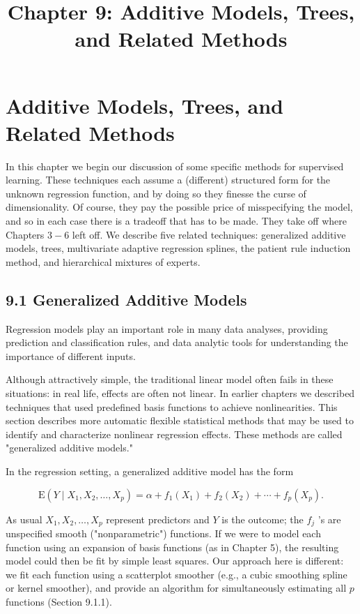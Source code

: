 \documentclass[10pt]{article}
\title{Chapter 9: Additive Models, Trees, and Related Methods}
\author{}
\date{}
\begin{document}
\maketitle

\section*{Additive Models, Trees, and Related Methods}
In this chapter we begin our discussion of some specific methods for supervised learning. These techniques each assume a (different) structured form for the unknown regression function, and by doing so they finesse the curse of dimensionality. Of course, they pay the possible price of misspecifying the model, and so in each case there is a tradeoff that has to be made. They take off where Chapters $3-6$ left off. We describe five related techniques: generalized additive models, trees, multivariate adaptive regression splines, the patient rule induction method, and hierarchical mixtures of experts.

\subsection*{9.1 Generalized Additive Models}
Regression models play an important role in many data analyses, providing prediction and classification rules, and data analytic tools for understanding the importance of different inputs.

Although attractively simple, the traditional linear model often fails in these situations: in real life, effects are often not linear. In earlier chapters we described techniques that used predefined basis functions to achieve nonlinearities. This section describes more automatic flexible statistical methods that may be used to identify and characterize nonlinear regression effects. These methods are called "generalized additive models."

In the regression setting, a generalized additive model has the form


\begin{equation*}
\mathrm{E}\left(Y \mid X_{1}, X_{2}, \ldots, X_{p}\right)=\alpha+f_{1}\left(X_{1}\right)+f_{2}\left(X_{2}\right)+\cdots+f_{p}\left(X_{p}\right) . \tag{9.1}
\end{equation*}


As usual $X_{1}, X_{2}, \ldots, X_{p}$ represent predictors and $Y$ is the outcome; the $f_{j}$ 's are unspecified smooth ("nonparametric") functions. If we were to model each function using an expansion of basis functions (as in Chapter 5), the resulting model could then be fit by simple least squares. Our approach here is different: we fit each function using a scatterplot smoother (e.g., a cubic smoothing spline or kernel smoother), and provide an algorithm for simultaneously estimating all $p$ functions (Section 9.1.1).
\end{document}
